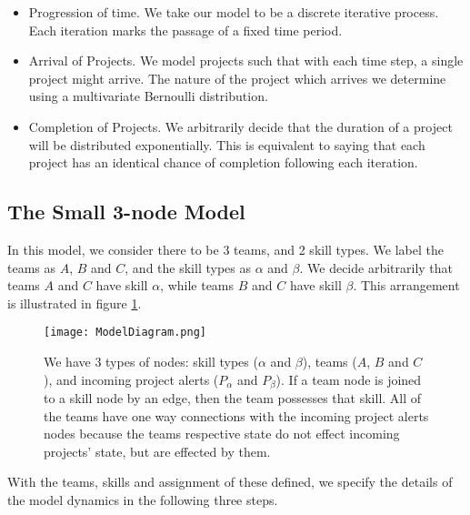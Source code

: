 \begin{itemize}
	\item Progression of time. We take our model to be a discrete iterative process. Each iteration marks the passage of a fixed time period. 

	\item Arrival of Projects. We model projects such that with each time step, a single project might arrive. The nature of the project which arrives we determine using a multivariate Bernoulli distribution.
	
	\item Completion of Projects. We arbitrarily decide that the duration of a project will be distributed exponentially. This is equivalent to saying that each project has an identical chance of completion following each iteration.
\end{itemize}


\subsection{The Small 3-node Model}
\label{sec:3nodemodel}
In this model, we consider there to be 3 teams, and 2 skill types. We label the teams as $A$, $B$ and $C$, and the skill types as $\alpha$ and $\beta$. We decide arbitrarily that teams $A$ and $C$ have skill $\alpha$, while teams $B$ and $C$ have skill $\beta$. This arrangement is illustrated in figure \ref{fig:diagram1}.

\begin{figure}[ht]
	\centering

	\texttt{[image: ModelDiagram.png]}
	\caption{We have 3 types of nodes: skill types ($\alpha$ and $\beta$), teams ($A$, $B$ and $C$), and incoming project alerts ($P_\alpha$ and $P_\beta$). If a team node is joined to a skill node by an edge, then the team possesses that skill. All of the teams have one way connections with the incoming project alerts nodes because the teams respective state do not effect incoming projects' state, but are effected by them.}
	\label{fig:diagram1}
\end{figure}

With the teams, skills and assignment of these defined, we specify the details of the model dynamics in the following three steps.

